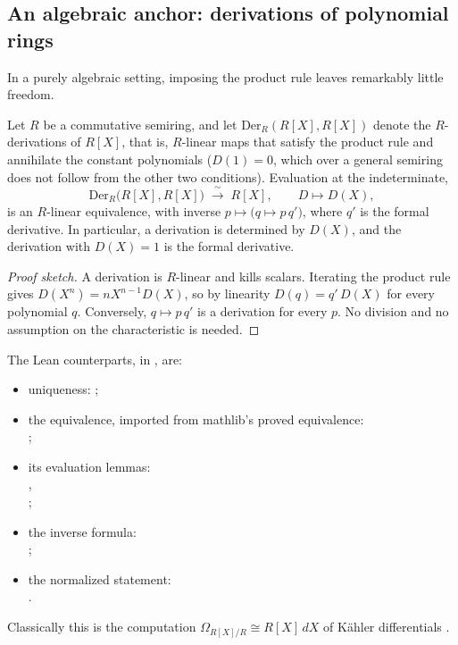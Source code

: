 \subsection{An algebraic anchor: derivations of polynomial rings}
\label{subsec:poly}
In a purely algebraic setting, imposing the product rule leaves remarkably little freedom.

\begin{theorem}\label{thm:derivation-determined-by-X}
Let $R$ be a commutative semiring, and let $\mathrm{Der}_R(R[X],R[X])$ denote the $R$-derivations of $R[X]$, that is, $R$-linear maps that satisfy the product rule and annihilate the constant polynomials ($D(1)=0$, which over a general semiring does not follow from the other two conditions). Evaluation at the indeterminate,
\[
  \mathrm{Der}_R\bigl(R[X],R[X]\bigr)\;\xrightarrow{\ \sim\ }\;R[X],\qquad D\longmapsto D(X),
\]
is an $R$-linear equivalence, with inverse $p\mapsto\bigl(q\mapsto p\,q'\bigr)$, where $q'$ is the formal derivative. In particular, a derivation is determined by $D(X)$, and the derivation with $D(X)=1$ is the formal derivative.
\end{theorem}

\begin{proof}[Proof sketch]
A derivation is $R$-linear and kills scalars. Iterating the product rule gives $D(X^n)=nX^{n-1}D(X)$, so by linearity $D(q)=q'\,D(X)$ for every polynomial $q$. Conversely, $q\mapsto p\,q'$ is a derivation for every $p$. No division and no assumption on the characteristic is needed.
\end{proof}

\noindent The Lean counterparts, in , are:
\begin{itemize}
  \item uniqueness: ;
  \item the equivalence, imported from mathlib's proved equivalence:\\ ;
  \item its evaluation lemmas:\\ ,\\ ;
  \item the inverse formula:\\ ;
  \item the normalized statement:\\ .
\end{itemize}
Classically this is the computation $\Omega_{R[X]/R}\cong R[X]\,dX$ of K\"ahler differentials \cite{StacksProject00RM}.

